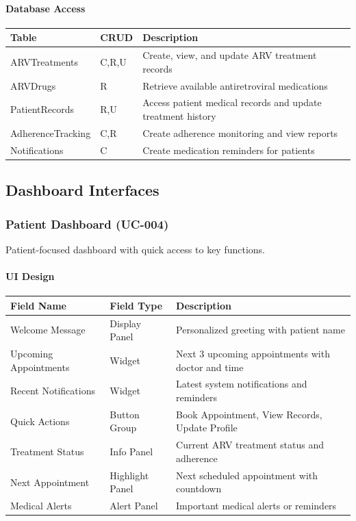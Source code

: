 \documentclass[12pt,a4paper]{article}
\begin{document}
\paragraph{Database Access}

\begin{longtable}{|p{3cm}|p{2cm}|p{9cm}|}
\hline
\textbf{Table} & \textbf{CRUD} & \textbf{Description} \\
\hline
ARVTreatments & C,R,U & Create, view, and update ARV treatment records \\
\hline
ARVDrugs & R & Retrieve available antiretroviral medications \\
\hline
PatientRecords & R,U & Access patient medical records and update treatment history \\
\hline
AdherenceTracking & C,R & Create adherence monitoring and view reports \\
\hline
Notifications & C & Create medication reminders for patients \\
\hline
\end{longtable}

\subsection{Dashboard Interfaces}

\subsubsection{Patient Dashboard (UC-004)}

Patient-focused dashboard with quick access to key functions.

\paragraph{UI Design}

\begin{longtable}{|p{3cm}|p{3cm}|p{8cm}|}
\hline
\textbf{Field Name} & \textbf{Field Type} & \textbf{Description} \\
\hline
Welcome Message & Display Panel & Personalized greeting with patient name \\
\hline
Upcoming Appointments & Widget & Next 3 upcoming appointments with doctor and time \\
\hline
Recent Notifications & Widget & Latest system notifications and reminders \\
\hline
Quick Actions & Button Group & Book Appointment, View Records, Update Profile \\
\hline
Treatment Status & Info Panel & Current ARV treatment status and adherence \\
\hline
Next Appointment & Highlight Panel & Next scheduled appointment with countdown \\
\hline
Medical Alerts & Alert Panel & Important medical alerts or reminders \\
\hline
\end{longtable}
\end{document}
